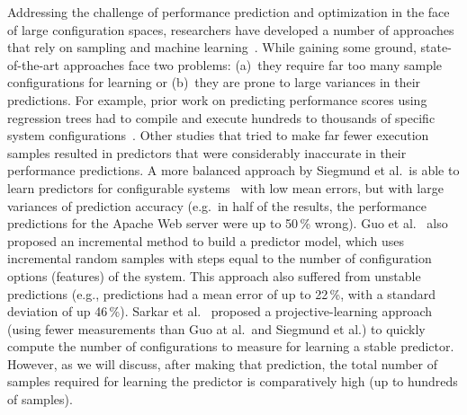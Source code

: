 \documentclass{newsig}
\begin{document}
Addressing the challenge of performance prediction and optimization in the face of large configuration spaces, researchers have developed a number of approaches that rely on sampling and machine learning~\cite{siegmund2012predicting,guo2013variability,sarkar2015cost}. While gaining some ground, state-of-the-art approaches face two problems: 
(a)~they require far too many sample configurations for learning or (b)~they are prone to large variances in their predictions. For example, prior work on predicting performance scores using regression trees had to compile and execute hundreds to thousands of specific system configurations~\cite{guo2013variability}. 
Other studies that tried to make far fewer execution samples resulted in predictors that were considerably inaccurate in their performance predictions.
A more balanced approach by Siegmund et al.\ is able to learn predictors for  configurable systems~\cite{siegmund2012predicting} with low mean errors, but with large variances of prediction accuracy  (e.g.\ in half of the results, the performance predictions for the Apache Web server were up to 50\,\% wrong). 
Guo et al.~\cite{guo2013variability} also proposed an incremental method to build a predictor model, which uses incremental random samples with steps equal to the number of configuration options (features) of the system. This approach also
suffered from  unstable predictions (e.g., predictions had a mean error of up to 22\,\%, with a standard deviation of up 46\,\%). Sarkar et al.~\cite{sarkar2015cost} proposed a proj\-ective-learning approach (using fewer measurements than Guo at al.\ and Siegmund et al.) to quickly compute  the number of configurations to measure for learning a stable predictor. However, as we will discuss, after making that prediction, the total number of samples required for learning the predictor is comparatively high (up to hundreds of samples).
\end{document}
